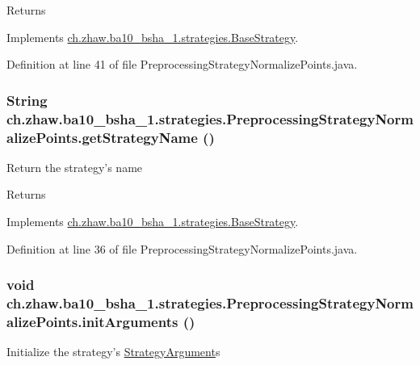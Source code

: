 \begin{DoxyReturn}{Returns}

\end{DoxyReturn}


Implements \hyperlink{classch_1_1zhaw_1_1ba10__bsha__1_1_1strategies_1_1BaseStrategy_a75fdb36932ad701f6375cc1fe718056b}{ch.zhaw.ba10\_\-bsha\_\-1.strategies.BaseStrategy}.

Definition at line 41 of file PreprocessingStrategyNormalizePoints.java.\hypertarget{classch_1_1zhaw_1_1ba10__bsha__1_1_1strategies_1_1PreprocessingStrategyNormalizePoints_ac9826f8ef875b62955887e6f3ffe7cff}{
\subsubsection[{getStrategyName}]{\setlength{\rightskip}{0pt plus 5cm}String ch.zhaw.ba10\_\-bsha\_\-1.strategies.PreprocessingStrategyNormalizePoints.getStrategyName ()}}
\label{classch_1_1zhaw_1_1ba10__bsha__1_1_1strategies_1_1PreprocessingStrategyNormalizePoints_ac9826f8ef875b62955887e6f3ffe7cff}
Return the strategy's name

\begin{DoxyReturn}{Returns}

\end{DoxyReturn}


Implements \hyperlink{classch_1_1zhaw_1_1ba10__bsha__1_1_1strategies_1_1BaseStrategy_aa0ebed55eed45409bad13d43a0058780}{ch.zhaw.ba10\_\-bsha\_\-1.strategies.BaseStrategy}.

Definition at line 36 of file PreprocessingStrategyNormalizePoints.java.\hypertarget{classch_1_1zhaw_1_1ba10__bsha__1_1_1strategies_1_1PreprocessingStrategyNormalizePoints_a0c81b7ac2ba72e201512d5f6de524e14}{
\subsubsection[{initArguments}]{\setlength{\rightskip}{0pt plus 5cm}void ch.zhaw.ba10\_\-bsha\_\-1.strategies.PreprocessingStrategyNormalizePoints.initArguments ()}}
\label{classch_1_1zhaw_1_1ba10__bsha__1_1_1strategies_1_1PreprocessingStrategyNormalizePoints_a0c81b7ac2ba72e201512d5f6de524e14}
Initialize the strategy's \hyperlink{classch_1_1zhaw_1_1ba10__bsha__1_1_1StrategyArgument}{StrategyArgument}s 

